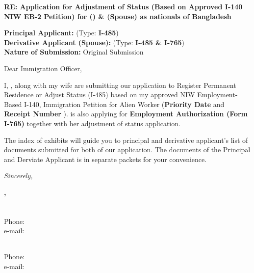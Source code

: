 \documentclass{letter}
\date{\today}
\begin{document}
% 
\begin{letter}{\USCISaddress

\vspace{0.5cm}

\textbf{RE: Application for Adjustment of Status (Based on Approved I-140 NIW EB-2 Petition)
for \textit{\pApplicant} (\Anum) \& \textit{\dApplicant} (Spouse) as nationals of Bangladesh }
\vspace{0.5cm}

\textbf{Principal Applicant:} \pApplicant  ({Type:} \textbf{I-485})\\
\textbf{Derivative Applicant (Spouse):} \dApplicant  ({Type:} \textbf{I-485 \& I-765})\\
\textbf{Nature of Submission:} Original Submission \\

}






\opening{Dear Immigration Officer,}


I, \textbf{\pApplicant}, along with  my wife \textbf{\dApplicant} are submitting our application to Register Permanent Residence or Adjust Status (I-485) based on my approved NIW Employment-Based I-140, Immigration Petition for Alien Worker (\textbf{Priority Date \priorityDate} and \textbf{Receipt Number \ReceiptNumber}).\textbf{\dApplicant} is also applying for \textbf{Employment Authorization (Form I-765)} together with her adjustment of status application.



The index of exhibits will guide you to principal and derivative applicant's list of documents submitted for both of our application. The documents of the Principal and Derviate Applicant is in separate packets for your convenience.

\vspace{1.5cm}
\textit{Sincerely,}

\begin{minipage}[t]{0.5\textwidth}
\vspace{1.5cm}
\textbf{\pApplicant,} \\
\textit{\pAddress} \\
\pCity \\
Phone: \pPhone \\
e-mail: \pEmail \\
\end{minipage}%
\begin{minipage}[t]{0.5\textwidth}
\vspace{1.5cm}
\begin{flushright}
\textbf{\dApplicant} \\
Phone: \dPhone \\
e-mail: \dEmail
\end{flushright}
\end{minipage}

\end{letter}
\end{document}
